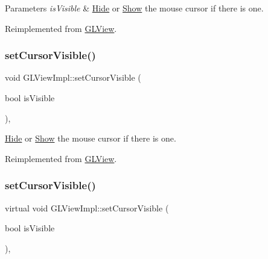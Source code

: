 \begin{DoxyParams}{Parameters}
{\em is\+Visible} & \hyperlink{classHide}{Hide} or \hyperlink{classShow}{Show} the mouse cursor if there is one. \\
\hline
\end{DoxyParams}


Reimplemented from \hyperlink{classGLView_a1d09cf734d01c1a789ded4caef734b2a}{G\+L\+View}.

\mbox{\label{classGLViewImpl_a6a90e8743caf5fff31f0502dc44c986d}} 
\subsubsection{\texorpdfstring{set\+Cursor\+Visible()}{setCursorVisible()}\hspace{0.1cm}{\footnotesize\ttfamily [2/3]}}
{\footnotesize\ttfamily void G\+L\+View\+Impl\+::set\+Cursor\+Visible (\begin{DoxyParamCaption}\item[{bool}]{is\+Visible }\end{DoxyParamCaption})\hspace{0.3cm}{\ttfamily [override]}, {\ttfamily [virtual]}}

\hyperlink{classHide}{Hide} or \hyperlink{classShow}{Show} the mouse cursor if there is one. 

Reimplemented from \hyperlink{classGLView_a1d09cf734d01c1a789ded4caef734b2a}{G\+L\+View}.

\mbox{\label{classGLViewImpl_a7e609efc4d34d98544b42e5f18ff29b8}} 
\subsubsection{\texorpdfstring{set\+Cursor\+Visible()}{setCursorVisible()}\hspace{0.1cm}{\footnotesize\ttfamily [3/3]}}
{\footnotesize\ttfamily virtual void G\+L\+View\+Impl\+::set\+Cursor\+Visible (\begin{DoxyParamCaption}\item[{bool}]{is\+Visible }\end{DoxyParamCaption})\hspace{0.3cm}{\ttfamily [override]}, {\ttfamily [virtual]}}

